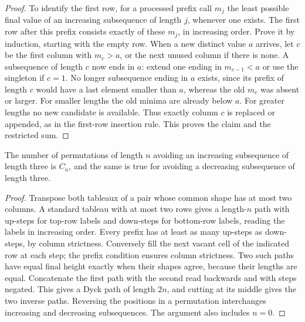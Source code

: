 \begin{proof}
To identify the first row, for a processed prefix call \(m_j\) the
least possible final value of an increasing subsequence of length \(j\),
whenever one exists. The first row after this prefix consists exactly
of these \(m_j\), in increasing order. Prove it by induction, starting
with the empty row. When a new distinct value \(a\) arrives, let \(c\)
be the first column with \(m_c>a\), or the next unused column if there
is none. A subsequence of length \(c\) now ends in \(a\): extend one
ending in \(m_{c-1}<a\) or use the singleton if \(c=1\). No longer
subsequence ending in \(a\) exists, since its prefix of length \(c\)
would have a last element smaller than \(a\), whereas the old \(m_c\)
was absent or larger. For smaller lengths the old minima are already
below \(a\). For greater lengths no new candidate is available. Thus
exactly column \(c\) is replaced or appended, as in the first-row
insertion rule. This proves the claim and the restricted sum.
\end{proof}

\begin{corollary}\label{result18}
The number of permutations of length \(n\) avoiding an increasing
subsequence of length three is \(C_n\), and the same is true for avoiding
a decreasing subsequence of length three.
\end{corollary}
\begin{proof}
Transpose both tableaux of a pair whose common shape has at most two
columns. A standard tableau with at most two rows gives a length-\(n\)
path with up-steps for top-row labels and down-steps for bottom-row
labels, reading the labels in increasing order. Every prefix has at least
as many up-steps as down-steps, by column strictness. Conversely fill
the next vacant cell of the indicated row at each step; the prefix
condition ensures column strictness. Two such paths have equal final
height exactly when their shapes agree, because their lengths are equal.
Concatenate the first path with the second read backwards and with steps
negated. This gives a Dyck path of length \(2n\), and cutting at its
middle gives the two inverse paths. Reversing the positions in a
permutation interchanges increasing and decreasing subsequences. The
argument also includes \(n=0\).
\end{proof}

